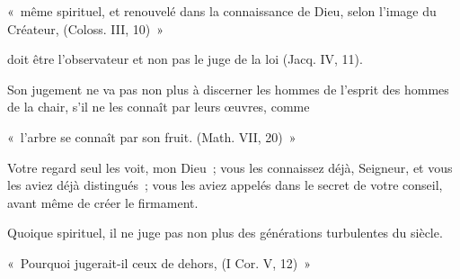 \documentclass[french,twoside]{book} %
\newenvironment{quoteblock}%
  {\begin{quoting}}
  {\end{quoting}}
\newenvironment{quotebar}{%
    \def\FrameCommand{{\color{rubric!10!}\vrule width 0.5em} \hspace{0.9em}}%
    \def\OuterFrameSep{\itemsep} %
    \MakeFramed {\advance\hsize-\width \FrameRestore}
  }%
  {%
    \endMakeFramed
  }
\renewenvironment{quoteblock}%
  {%
    \savenotes
    \setstretch{0.9}
    \normalfont
    \begin{quotebar}
  }
  {%
    \end{quotebar}
    \spewnotes
  }
\begin{document}
\begin{quoteblock}
\noindent « même spirituel, et renouvelé dans la connaissance de Dieu, selon l’image du Créateur, (Coloss. III, 10) »\end{quoteblock}

\noindent doit être l’observateur et non pas le juge de la loi (Jacq. IV, 11).\par
Son jugement ne va pas non plus à discerner les hommes de l’esprit des hommes de la chair, s’il ne les connaît par leurs œuvres, comme\par

\begin{quoteblock}
\noindent « l’arbre se connaît par son fruit. (Math. VII, 20) »\end{quoteblock}

\noindent Votre regard seul les voit, mon Dieu ; vous les connaissez déjà, Seigneur, et vous les aviez déjà distingués ; vous les aviez appelés dans le secret de votre conseil, avant même de créer le firmament.\par
Quoique spirituel, il ne juge pas non plus des générations turbulentes du siècle.\par

\begin{quoteblock}
\noindent « Pourquoi jugerait-il ceux de dehors, (I Cor. V, 12) »\end{quoteblock}
\end{document}
